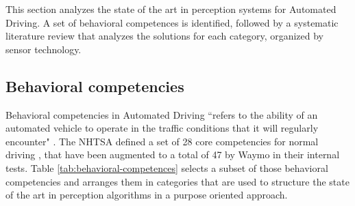
This section analyzes the state of the art in perception systems for Automated
Driving. A set of behavioral competences is identified, followed
by a systematic literature review that analyzes the 
solutions for each category, organized by sensor technology.

\subsection{Behavioral competencies}

Behavioral competencies in Automated Driving ``refers to the ability of an 
automated vehicle to operate in the traffic conditions that it will regularly
encounter" \cite{Nowakowski2015}. The NHTSA defined a set of 28 core 
competencies for normal driving \cite{NHTSA2016}, that have been augmented to a 
total of 47 by Waymo \cite{Waymo2017} in their internal tests.
Table \ref{tab:behavioral-competences} selects a subset of those behavioral
competencies and arranges them in categories that are used to structure the state of the art in
perception algorithms in a purpose oriented approach.
